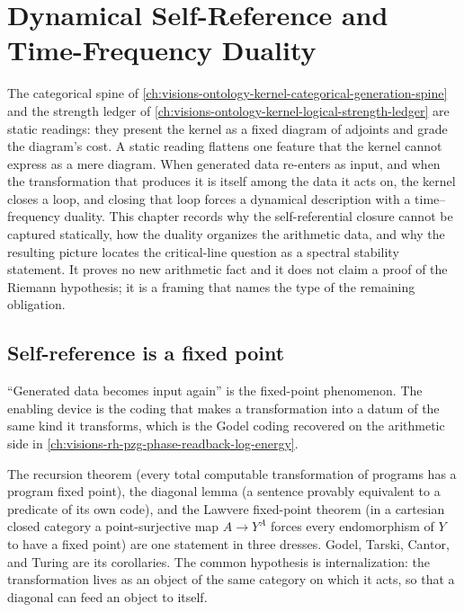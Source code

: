 \chapter{Dynamical Self-Reference and Time-Frequency Duality}
\label{ch:visions-ontology-kernel-dynamical-self-reference-duality}

The categorical spine of
\autoref{ch:visions-ontology-kernel-categorical-generation-spine} and the
strength ledger of
\autoref{ch:visions-ontology-kernel-logical-strength-ledger} are static
readings: they present the kernel as a fixed diagram of adjoints and grade the
diagram's cost.  A static reading flattens one feature that the kernel cannot
express as a mere diagram.  When generated data re-enters as input, and when the
transformation that produces it is itself among the data it acts on, the kernel
closes a loop, and closing that loop forces a dynamical description with a
time--frequency duality.  This chapter records why the self-referential closure
cannot be captured statically, how the duality organizes the arithmetic data,
and why the resulting picture locates the critical-line question as a spectral
stability statement.  It proves no new arithmetic fact and it does not claim a
proof of the Riemann hypothesis; it is a framing that names the type of the
remaining obligation.

\section{Self-reference is a fixed point}
\label{sec:ontology-kernel-self-reference-fixed-point}

``Generated data becomes input again'' is the fixed-point phenomenon.  The
enabling device is the coding that makes a transformation into a datum of the
same kind it transforms, which is the Godel coding recovered on the arithmetic
side in \autoref{ch:visions-rh-pzg-phase-readback-log-energy}.

\begin{principle}
\label{prin:ontology-kernel-lawvere-diagonal}
The recursion theorem (every total computable transformation of programs has a
program fixed point), the diagonal lemma (a sentence provably equivalent to a
predicate of its own code), and the Lawvere fixed-point theorem (in a cartesian
closed category a point-surjective map $A\to Y^A$ forces every endomorphism of
$Y$ to have a fixed point) are one statement in three dresses.  Godel, Tarski,
Cantor, and Turing are its corollaries.  The common hypothesis is
internalization: the transformation lives as an object of the same category on
which it acts, so that a diagonal can feed an object to itself.
\end{principle}


